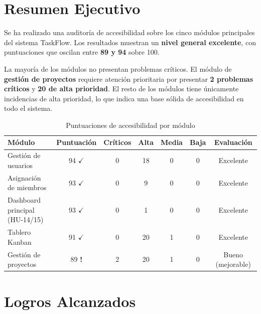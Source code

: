 \documentclass[12pt, a4paper]{article}
\newcommand{\ok}{\textcolor{accentgreen}{$\checkmark$}}
\newcommand{\warn}{\textcolor{accentorange}{\textbf{!}}}
\begin{document}
\tableofcontents
\newpage

\section{Resumen Ejecutivo}

Se ha realizado una auditoría de accesibilidad sobre los cinco módulos principales del sistema
TaskFlow. Los resultados muestran un \textbf{nivel general excelente}, con puntuaciones que
oscilan entre \textbf{89 y 94} sobre 100.

La mayoría de los módulos no presentan problemas críticos. El módulo de
\textbf{gestión de proyectos} requiere atención prioritaria por presentar
\textbf{2 problemas críticos} y \textbf{20 de alta prioridad}. El resto de los módulos
tiene únicamente incidencias de alta prioridad, lo que indica una base sólida de
accesibilidad en todo el sistema.

\vspace{0.5em}

\begin{table}[H]
\centering
\renewcommand{\arraystretch}{1.5}
\begin{tabularx}{\linewidth}{Xcccccc}
\toprule
\rowcolor{lightblue}
\textbf{Módulo} & \textbf{Puntuación} & \textbf{Críticos} & \textbf{Alta} &
\textbf{Media} & \textbf{Baja} & \textbf{Evaluación} \\
\midrule
\rowcolor{scoreok}
Gestión de usuarios          & 94 \ok & 0 & 18 & 0 & 0 & Excelente \\
\rowcolor{scoreok}
Asignación de miembros       & 93 \ok & 0 & 9  & 0 & 0 & Excelente \\
\rowcolor{scoreok}
Dashboard principal (HU-14/15) & 93 \ok & 0 & 1  & 0 & 0 & Excelente \\
\rowcolor{scoreok}
Tablero Kanban               & 91 \ok & 0 & 20 & 1 & 0 & Excelente \\
\rowcolor{scorewarn}
Gestión de proyectos         & 89 \warn & 2 & 20 & 1 & 0 & Bueno (mejorable) \\
\bottomrule
\end{tabularx}
\caption{Puntuaciones de accesibilidad por módulo}
\end{table}

\section{Logros Alcanzados}
\end{document}
